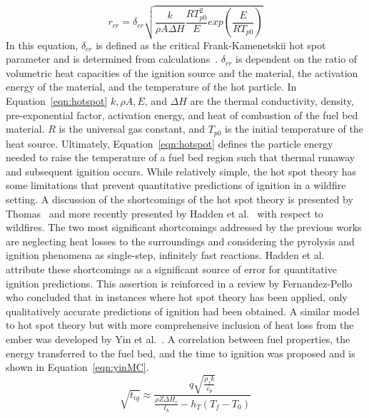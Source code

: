         \begin{equation}
            r_{cr} = \delta_{cr}\sqrt{\frac{k}{\rho A \Delta H}\frac{RT^{2}_{p0}}{E} exp\left(\frac{E}{RT_{p0}}  \right)}
            \label{eqn:hotspot}
        \end{equation}
    In this equation, $\delta_{cr}$ is defined as the critical Frank-Kamenetskii hot spot parameter and is determined from calculations~\cite{Goldshleger1973IgnitionDimensions}. $\delta_{cr}$ is dependent on the ratio of volumetric heat capacities of the ignition source and the material, the activation energy of the material, and the temperature of the hot particle. In Equation~\ref{eqn:hotspot} $k, \rho A, E$, and $\Delta H$ are the thermal conductivity, density, pre-exponential factor, activation energy, and heat of combustion of the fuel bed material. $R$ is the universal gas constant, and $T_{p0}$ is the initial temperature of the heat source. Ultimately, Equation~\ref{eqn:hotspot} defines the particle energy needed to raise the temperature of a fuel bed region such that thermal runaway and subsequent ignition occurs. While relatively simple, the hot spot theory has some limitations that prevent quantitative predictions of ignition in a wildfire setting. A discussion of the shortcomings of the hot spot theory is presented by Thomas~\cite{Thomas1965} and more recently presented by Hadden et al.~\cite{Hadden2011} with respect to wildfires. The two most significant shortcomings addressed by the previous works are neglecting heat losses to the surroundings and considering the pyrolysis and ignition phenomena as single-step, infinitely fast reactions. Hadden et al. attribute these shortcomings as a significant source of error for quantitative ignition predictions. This assertion is reinforced in a review by Fernandez-Pello~\cite{Fernandez-Pello2017} who concluded that in instances where hot spot theory has been applied, only qualitatively accurate predictions of ignition had been obtained. A similar model to hot spot theory but with more comprehensive inclusion of heat loss from the ember was developed by Yin et al.~\cite{Yin2014}. A correlation between fuel properties, the energy transferred to the fuel bed, and the time to ignition was proposed and is shown in Equation~\ref{eqn:yinMC}.
        \begin{equation}
            \sqrt{t_{ig}} \approx \frac{q\sqrt{\frac{\rho_{f}k}{c_{p}}}}{\frac{\rho Z \Delta H_c}{t_b}- h_T(T_f - T_0)}
            \label{eqn:yinMC}
        \end{equation}
